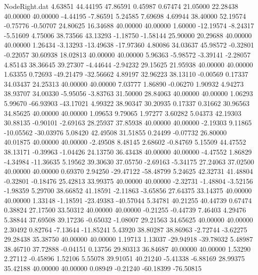 \begin{filecontents}{NodeRight.dat}
   4.63851   44.44195   47.86591     0.45987    0.67474   21.05000   22.28438   40.00000   40.00000   -4.44195   -7.86591    5.24585    7.69698
   4.69944   38.40000   52.19574    -0.75776   -0.50707   24.80625   16.34688   40.00000   40.00000    1.60000  -12.19574   -8.24317   -5.51609
   4.75006   38.73566   43.13293    -1.18750   -1.58144   25.90000   20.29688   40.00000   40.00000    1.26434   -3.13293  -13.49638  -17.97360
   4.80086   34.03637   45.98572    -0.32801   -0.22057   30.60938   18.02813   40.00000   40.00000    5.96363   -5.98572   -3.39141   -2.28057
   4.85143   38.36645   39.27307    -4.44644   -2.94232   29.15625   21.95938   40.00000   40.00000    1.63355    0.72693  -49.21479  -32.56662
   4.89197   32.96223   38.13110    -0.00569    0.17337   34.03437   24.25313   40.00000   40.00000    7.03777    1.86890   -0.06270    1.90932
   4.94273   38.93707   34.00330    -5.95056   -3.83763   31.50000   28.84063   40.00000   40.00000    1.06293    5.99670  -66.93903  -43.17021
   4.99322   38.90347   30.20935     0.17337    0.31662   30.96563   34.85625   40.00000   40.00000    1.09653    9.79065    1.97277    3.60282
   5.04373   42.19303   30.88135    -0.90101   -2.69163   28.25937   37.85938   40.00000   40.00000   -2.19303    9.11865  -10.05562  -30.03976
   5.08420   42.49508   31.51855     0.24499   -0.07732   26.80000   40.01875   40.00000   40.00000   -2.49508    8.48145    2.68602   -0.84769
   5.15509   44.47552   38.13171    -0.39963   -1.04426   24.13750   36.43438   40.00000   40.00000   -4.47552    1.86829   -4.34984  -11.36635
   5.19562   39.30630   37.05750    -2.69163   -5.34175   27.24063   37.02500   40.00000   40.00000    0.69370    2.94250  -29.47122  -58.48799
   5.24625   42.32731   41.48804    -0.32801   -0.18476   25.42813   33.99375   40.00000   40.00000   -2.32731   -1.48804   -3.52156   -1.98359
   5.29700   38.66852   41.18591    -2.11863   -3.65856   27.64375   33.14375   40.00000   40.00000    1.33148   -1.18591  -23.49383  -40.57044
   5.34781   40.21255   40.44739     0.67474    0.38824   27.17500   33.50312   40.00000   40.00000   -0.21255   -0.44739    7.46403    4.29476
   5.38844   37.69508   39.17236    -0.65032   -1.08007   29.21563   34.65625   40.00000   40.00000    2.30492    0.82764   -7.13644  -11.85241
   5.43920   38.80287   38.86963    -2.72744   -3.62275   29.28438   35.38750   40.00000   40.00000    1.19713    1.13037  -29.94918  -39.78032
   5.48987   38.46710   37.72888    -0.04151    0.13756   29.80313   36.84687   40.00000   40.00000    1.53290    2.27112   -0.45896    1.52106
   5.55078   39.91051   40.21240    -5.41338   -6.88169   28.99375   35.42188   40.00000   40.00000    0.08949   -0.21240  -60.18399  -76.50815

\end{filecontents}
